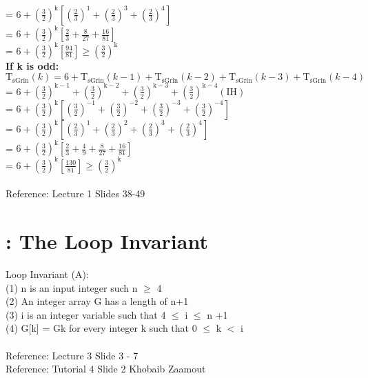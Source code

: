 \documentclass{article}
\begin{document}
    \\\indent\indent\indent\indent\indent= $6+\left(\frac{3}{2}\right)^{\mathrm{k}}\left[\left(\frac{2}{3}\right)^{1}+\left(\frac{2}{3}\right)^{3}+\left(\frac{2}{3}\right)^{4}\right]$
    \\\indent\indent\indent\indent\indent= $6+\left(\frac{3}{2}\right)^{\mathrm{k}}\left[\frac{2}{3}+\frac{8}{27}+\frac{16}{81}\right]$
    \\\indent\indent\indent\indent\indent= $6+\left(\frac{3}{2}\right)^{\mathrm{k}}\left[\frac{94}{81}\right] \geq\left(\frac{3}{2}\right)^{\mathrm{k}}$
    \\\textbf{If k is odd:}
    \\\indent\indent$\mathrm{T}_{\mathrm{sGrin}}(k)=6+\mathrm{T}_{\mathrm{sGrin}}(k-1)+\mathrm{T}_{\mathrm{sGrin}}(k-2)+\mathrm{T}_{\mathrm{sGrin}}(k-3)+\mathrm{T}_{\mathrm{sGrin}}(k-4)$
    \\\indent\indent\indent\indent\indent= $6+\left(\frac{3}{2}\right)^{\mathrm{k}-1}+\left(\frac{3}{2}\right)^{\mathrm{k}-2}+\left(\frac{3}{2}\right)^{\mathrm{k}-3}+\left(\frac{3}{2}\right)^{\mathrm{k}-4}(\mathrm{IH})$
    \\\indent\indent\indent\indent\indent= $6+\left(\frac{3}{2}\right)^{\mathrm{k}}\left[\left(\frac{3}{2}\right)^{-1}+\left(\frac{3}{2}\right)^{-2}+\left(\frac{3}{2}\right)^{-3}+\left(\frac{3}{2}\right)^{-4}\right]$
    \\\indent\indent\indent\indent\indent= $6+\left(\frac{3}{2}\right)^{\mathrm{k}}\left[\left(\frac{2}{3}\right)^{1}+\left(\frac{2}{3}\right)^{2}+\left(\frac{2}{3}\right)^{3}+\left(\frac{2}{3}\right)^{4}\right]$
    \\\indent\indent\indent\indent\indent= $6+\left(\frac{3}{2}\right)^{\mathrm{k}}\left[\frac{2}{3}+\frac{4}{9}+\frac{8}{27}+\frac{16}{81}\right]$
    \\\indent\indent\indent\indent\indent= $6+\left(\frac{3}{2}\right)^{\mathrm{k}}\left[\frac{130}{81}\right] \geq\left(\frac{3}{2}\right)^{\mathrm{k}}$
    \\
    \\Reference: Lecture 1 Slides 38-49


    \section{: The Loop Invariant}
    Loop Invariant (A):\\
    (1) n is an input integer such n $\geq$ 4\\
    (2) An integer array G has a length of n+1\\
    (3) i is an integer variable such that 4 $\leq$ i $\leq$ n +1\\
    (4) G[k] = Gk for every integer k such that 0 $\leq$ k $<$ i \\
    \\ Reference: Lecture 3 Slide 3 - 7
    \\ Reference: Tutorial 4 Slide 2 Khobaib Zaamout
    \\
\end{document}
